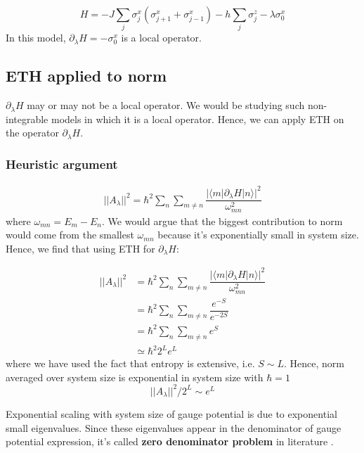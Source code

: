 \documentclass[11pt,a4paper]{article}
\begin{document}
\begin{equation}
H= -J \sum_{j} \sigma_j^x (\sigma_{j+1}^x+ \sigma_{j-1}^x) - h\sum_{j} \sigma_j^z -\lambda  \sigma_0^x 
\end{equation}
In this model, $\partial_{\lambda}H = -  \sigma_0^x  $ is a local operator.


\subsection{ETH applied to norm}
$\partial_{\lambda}H$ may or may not be a local operator. We would be studying such non-integrable models in which it is a local operator. Hence, we can apply ETH on the operator $\partial_{\lambda}H$.

\subsubsection{Heuristic argument}
\begin{align*}
||A_{\lambda}||^2= \hbar^2\sum_n \sum_{m \neq n}  \dfrac{|\langle m | \partial_{\lambda}H| n \rangle|^2}{\omega_{mn}^2}
\end{align*}
where $\omega_{mn}= E_m-E_n$.
We would argue that the biggest contribution to norm would come from the smallest $\omega_{mn}$ because it's exponentially small in system size. Hence, we find that using ETH for  $\partial_{\lambda}H$:

\begin{align*}
||A_{\lambda}||^2&= \hbar^2\sum_n \sum_{m \neq n}  \dfrac{|\langle m | \partial_{\lambda}H| n \rangle|^2}{\omega_{mn}^2}\\
&= \hbar^2\sum_n \sum_{m \neq n}  \dfrac{ e^{-S}}{e^{-2S}} \\
&= \hbar^2\sum_n \sum_{m \neq n}  e^{S} \\
& \simeq \hbar^2 2^L  e^{L} 
\end{align*}
where we have used the fact that entropy is extensive, i.e. $S \sim L$. Hence, norm averaged over system size is exponential in system size with $\hbar=1$
\begin{equation}
\boxed{||A_{\lambda}||^2/ 2^L \sim  e^{L} 
}
\end{equation}

Exponential scaling with system size of gauge potential is due to exponential small eigenvalues. Since these eigenvalues appear in the denominator of gauge potential expression, it's called \textbf{zero denominator problem} in literature \cite{kolodrubetz2016geometry}. 
\end{document}
